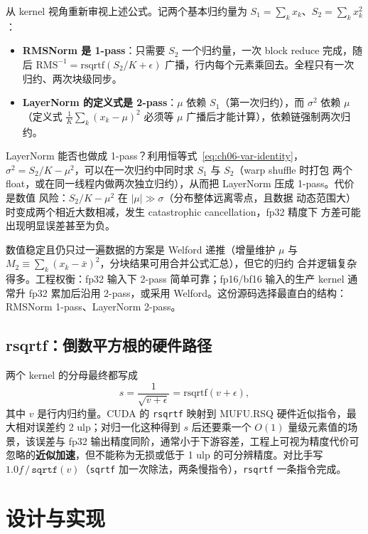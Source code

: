 从 kernel 视角重新审视上述公式。记两个基本归约量为 $S_1 = \sum_k x_k$、$S_2 = \sum_k x_k^2$：
\begin{itemize}
  \item \textbf{RMSNorm 是 1-pass}：只需要 $S_2$ 一个归约量，一次 block reduce 完成，随后 $\mathrm{RMS}^{-1} = \mathrm{rsqrtf}(S_2/K + \epsilon)$ 广播，行内每个元素乘回去。全程只有一次归约、两次块级同步。
  \item \textbf{LayerNorm 的定义式是 2-pass}：$\mu$ 依赖 $S_1$（第一次归约），而 $\sigma^2$ 依赖 $\mu$（定义式 $\frac{1}{K}\sum_k (x_k-\mu)^2$ 必须等 $\mu$ 广播后才能计算），依赖链强制两次归约。
\end{itemize}

LayerNorm 能否也做成 1-pass？利用恒等式~\eqref{eq:ch06-var-identity}，
$\sigma^2 = S_2/K - \mu^2$，可以在一次归约中同时求 $S_1$ 与 $S_2$（warp shuffle 时打包
两个 float，或在同一线程内做两次独立归约），从而把 LayerNorm 压成 1-pass。代价是数值
风险：$S_2/K - \mu^2$ 在 $|\mu| \gg \sigma$（分布整体远离零点，且数据
动态范围大）时变成两个相近大数相减，发生 catastrophic cancellation，fp32 精度下
方差可能出现明显误差甚至为负。

数值稳定且仍只过一遍数据的方案是 Welford 递推（增量维护
$\mu$ 与 $M_2 \equiv \sum_k (x_k-\bar{x})^2$，分块结果可用合并公式汇总），但它的归约
合并逻辑复杂得多。工程权衡：fp32 输入下 2-pass 简单可靠；fp16/bf16 输入的生产 kernel
通常升 fp32 累加后沿用 2-pass，或采用 Welford。这份源码选择最直白的结构：RMSNorm
1-pass、LayerNorm 2-pass。

\subsection{rsqrtf：倒数平方根的硬件路径}

两个 kernel 的分母最终都写成
\begin{equation}
  s = \frac{1}{\sqrt{v + \epsilon}} = \mathrm{rsqrtf}(v + \epsilon),
\end{equation}
其中 $v$ 是行内归约量。CUDA 的 \texttt{rsqrtf} 映射到 MUFU.RSQ 硬件近似指令，最大相对误差约 2 ulp；对归一化这种得到 $s$ 后还要乘一个 $O(1)$ 量级元素值的场景，该误差与 fp32 输出精度同阶，通常小于下游容差，工程上可视为精度代价可忽略的\textbf{近似加速}，但不能称为无损或低于 1 ulp 的可分辨精度。对比手写 $1.0f\,/\,\texttt{sqrtf}(v)$（\texttt{sqrtf} 加一次除法，两条慢指令），\texttt{rsqrtf} 一条指令完成。

\section{设计与实现}

